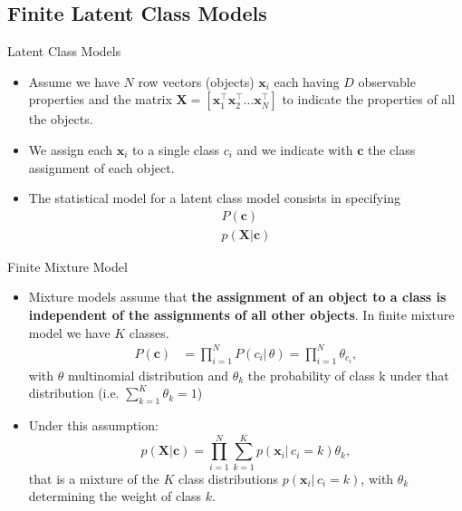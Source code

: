 \documentclass[aspectratio=169,xcolor=dvipsnames]{beamer}
\newcommand{\vecx}{\textbf{x}}
\newcommand{\vecc}{\textbf{c}}
\newcommand{\matx}{\textbf{X}}
\begin{document}
\subsection{Finite Latent Class Models} 
\begin{frame}{Latent Class Models}
\setlength{\leftmargini}{0.2cm}
\begin{itemize}
\item Assume we have $N$ row vectors (objects) $\vecx_i$ each having $D$ observable properties and the matrix $\matx = [\vecx^{\top}_1 \vecx^{\top}_2 \dots \vecx^{\top}_N ]$ to indicate the properties of all the objects.
\item We assign each $\vecx_i$ to a single class $c_i$ and we indicate with $\vecc$ the class assignment of each object.
\item The statistical model for a latent class model consists in specifying 
\begin{gather*}
  P(\vecc) \\
  p(\matx|\vecc)   
\end{gather*}
\end{itemize}
\end{frame}
\begin{frame}{Finite Mixture Model}
\setlength{\leftmargini}{0.2cm}
\begin{itemize}
\item Mixture models assume that \textbf{the assignment of an object to a class is independent of the assignments of all other objects}. In finite mixture model we have $K$ classes.
\begin{align*}
    P(\vecc) &= \prod_{i=1}^{N} P(c_i| \, \theta) =  \prod_{i=1}^{N} \theta_{c_i},
\end{align*}
with $\theta$ multinomial distribution and $\theta_k$ the probability of class k under that distribution (i.e. $\sum_{k=1}^{K} \theta_k=1$)
\item Under this assumption:
\begin{equation*}
      p(\matx|\vecc) = \prod_{i=1}^{N} \sum_{k=1}^{K} p(\vecx_i| \, c_i=k)\theta_k,
\end{equation*}
that is a mixture of the $K$ class distributions $p(\vecx_i| \, c_i = k)$, with $\theta_k$ determining the weight of class $k$.
\end{itemize}
\end{frame}
\end{document}
